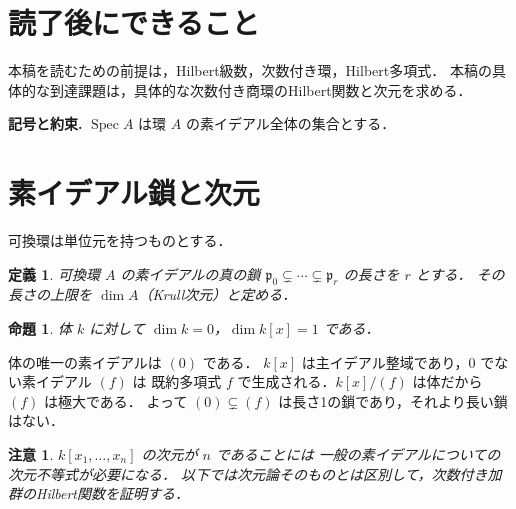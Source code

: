 \documentclass[a5paper,10pt,onecolumn]{jsarticle}
\makeatletter
\theoremstyle{mathnotetheorem}
\newtheorem{definition}[theorem]{定義}
\newtheorem{proposition}[theorem]{命題}
\newtheorem{remark}[theorem]{注意}
\renewcommand{\proofname}{証明}
\renewenvironment{proof}[1][\proofname]{%
  \par\pushQED{\qed}\normalfont\topsep4\p@\@plus2\p@\relax
  \trivlist\item[\hskip\labelsep\bfseries #1]\ignorespaces
}{\popQED\endtrivlist\@endpefalse}
\makeatother
\begin{document}
\section*{読了後にできること}
本稿を読むための前提は，Hilbert級数，次数付き環，Hilbert多項式．
本稿の具体的な到達課題は，具体的な次数付き商環のHilbert関数と次元を求める．


\par\noindent\textbf{記号と約束.}\quad
$\operatorname{Spec} A$ は環 $A$ の素イデアル全体の集合とする．
\par

\section{素イデアル鎖と次元}
可換環は単位元を持つものとする．
\begin{definition}
可換環 $A$ の素イデアルの真の鎖
$\mathfrak p_0\subsetneq\cdots\subsetneq\mathfrak p_r$ の長さを $r$ とする．
その長さの上限を $\dim A$（Krull次元）と定める．
\end{definition}
\begin{proposition}
体 $k$ に対して $\dim k=0$，$\dim k[x]=1$ である．
\end{proposition}
\begin{proof}
体の唯一の素イデアルは $(0)$ である．
$k[x]$ は主イデアル整域であり，$0$ でない素イデアル $(f)$ は
既約多項式 $f$ で生成される．$k[x]/(f)$ は体だから $(f)$ は極大である．
よって $(0)\subsetneq(f)$ は長さ1の鎖であり，それより長い鎖はない．
\end{proof}
\begin{remark}
$k[x_1,\ldots,x_n]$ の次元が $n$ であることには
一般の素イデアルについての次元不等式が必要になる．
以下では次元論そのものとは区別して，次数付き加群のHilbert関数を証明する．
\end{remark}
\end{document}
